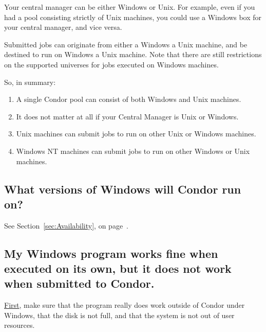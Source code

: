 Your central manager can be either Windows or Unix.  For example,
even if you had a pool consisting strictly of Unix machines, you could
use a Windows box for your central manager, and vice versa.

Submitted jobs can originate from either a 
Windows  a Unix machine,
and be destined to run on Windows
 a Unix machine.
Note that there are still restrictions on the supported universes
for jobs executed on Windows machines.

So, in summary:

\begin{enumerate}

\item{A single Condor pool can consist of both Windows and Unix
machines.}

\item{It does not matter at all if your Central Manager is Unix or Windows.}

\item{Unix machines can submit jobs to run on other Unix or Windows
machines.}

\item{Windows NT machines can submit jobs to run on other Windows
or Unix machines.}

\end{enumerate}


\subsection*{What versions of Windows will Condor run on?}

See Section~\ref{sec:Availability}, on
page~\pageref{sec:Availability}.


\subsection*{My Windows program works fine when executed on its own, but it
does not work when submitted to Condor.}

\underline{First}, make sure that the program really does work
outside of Condor under Windows,
that the disk is not full,
and that the system is not out of user resources.

